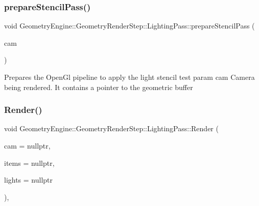 \subsubsection{\texorpdfstring{prepareStencilPass()}{prepareStencilPass()}}
{\footnotesize\ttfamily void Geometry\+Engine\+::\+Geometry\+Render\+Step\+::\+Lighting\+Pass\+::prepare\+Stencil\+Pass (\begin{DoxyParamCaption}\item[{\mbox{\hyperlink{class_geometry_engine_1_1_geometry_world_item_1_1_geometry_camera_1_1_camera}{Geometry\+World\+Item\+::\+Geometry\+Camera\+::\+Camera}} $\ast$}]{cam }\end{DoxyParamCaption})\hspace{0.3cm}{\ttfamily [protected]}}

Prepares the Open\+Gl pipeline to apply the light stencil test param cam Camera being rendered. It contains a pointer to the geometric buffer \mbox{\label{class_geometry_engine_1_1_geometry_render_step_1_1_lighting_pass_ae6d9fa99f67e659839ca310947787f52}} 
\subsubsection{\texorpdfstring{Render()}{Render()}}
{\footnotesize\ttfamily void Geometry\+Engine\+::\+Geometry\+Render\+Step\+::\+Lighting\+Pass\+::\+Render (\begin{DoxyParamCaption}\item[{\mbox{\hyperlink{class_geometry_engine_1_1_geometry_world_item_1_1_geometry_camera_1_1_camera}{Geometry\+World\+Item\+::\+Geometry\+Camera\+::\+Camera}} $\ast$}]{cam = {\ttfamily nullptr},  }\item[{std\+::unordered\+\_\+set$<$ \mbox{\hyperlink{class_geometry_engine_1_1_geometry_world_item_1_1_geometry_item_1_1_geometry_item}{Geometry\+World\+Item\+::\+Geometry\+Item\+::\+Geometry\+Item}} $\ast$ $>$ $\ast$}]{items = {\ttfamily nullptr},  }\item[{std\+::unordered\+\_\+set$<$ \mbox{\hyperlink{class_geometry_engine_1_1_geometry_world_item_1_1_geometry_light_1_1_light}{Geometry\+World\+Item\+::\+Geometry\+Light\+::\+Light}} $\ast$ $>$ $\ast$}]{lights = {\ttfamily nullptr} }\end{DoxyParamCaption})\hspace{0.3cm}{\ttfamily [override]}, {\ttfamily [virtual]}}

